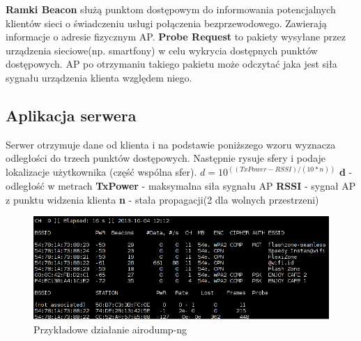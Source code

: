 \documentclass{article}
\begin{document}
\textbf{Ramki Beacon} służą punktom dostępowym do informowania potencjalnych klientów sieci o świadczeniu usługi połączenia bezprzewodowego. Zawierają informacje o adresie fizycznym AP.
\newline
\newline
\textbf{Probe Request} to pakiety wysyłane przez urządzenia sieciowe(np. smartfony) w celu wykrycia dostępnych punktów dostępowych. AP po otrzymaniu takiego pakietu może odczytać jaka jest siła sygnału urządzenia klienta względem niego.

\subsection{Aplikacja serwera}

Serwer otrzymuje dane od klienta i na podstawie poniższego wzoru wyznacza odległości do trzech punktów dostępowych. Następnie rysuje sfery i podaje lokalizacje użytkownika (część wspólna sfer).
\newline
\newline
\Huge{
\begin{math}
d = 10 ^{((TxPower - RSSI) / (10 * n))}
\end{math}
}
\newline
\newline
\normalsize{
\textbf{d} - odległość w metrach \newline
\textbf{TxPower} - maksymalna siła sygnału AP \newline
\textbf{RSSI} - sygnał AP z punktu widzenia klienta \newline
\textbf{n} - stała propagacji(2 dla wolnych przestrzeni) \newline
}


\begin{figure}[H]
	\centering
	\includegraphics[width=15cm]{airodump.png}
	\caption{Przykładowe działanie airodump-ng}
	\label{fig:obrazek airodump.png}
\end{figure}

\newpage
\end{document}
